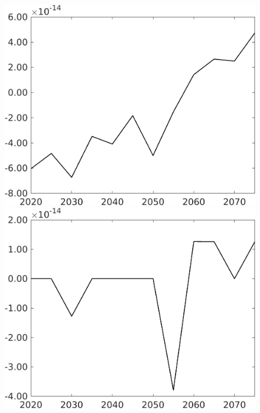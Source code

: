 \begin{figure}[h!!]
\begin{minipage}[]{0.32\textwidth}
\end{minipage}	
	\begin{minipage}[]{0.32\textwidth}
		\includegraphics[width=1\textwidth]{../../codding_model/own_basedOnFried/optimalPol_010922_revision/figures/all_13Sept22/CompTaul_Equlab_LFBAUPer_Reg0_GFF_spillover0_nsk1_xgr1_knspil0_sep1_countec0_GovRev0_etaa0.79.png}
	\end{minipage}	
\begin{minipage}[]{0.32\textwidth}
\includegraphics[width=1\textwidth]{../../codding_model/own_basedOnFried/optimalPol_010922_revision/figures/all_13Sept22/CompTaul_Equlab_LFBAUPer_Reg0_EY_spillover0_nsk1_xgr1_knspil0_sep1_countec0_GovRev0_etaa0.79.png}

\end{minipage}
\end{figure}
